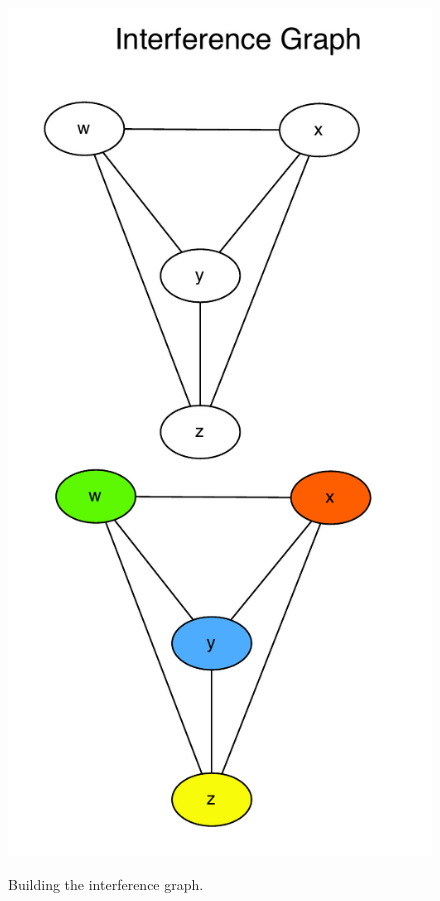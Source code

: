 \begin{figure}[!htbp]
    \centering
    \caption{Building the interference graph.}
    \includegraphics[scale=0.60]{register_allocation2.pdf}
    \label{fig:regalloc2}
\end{figure}

